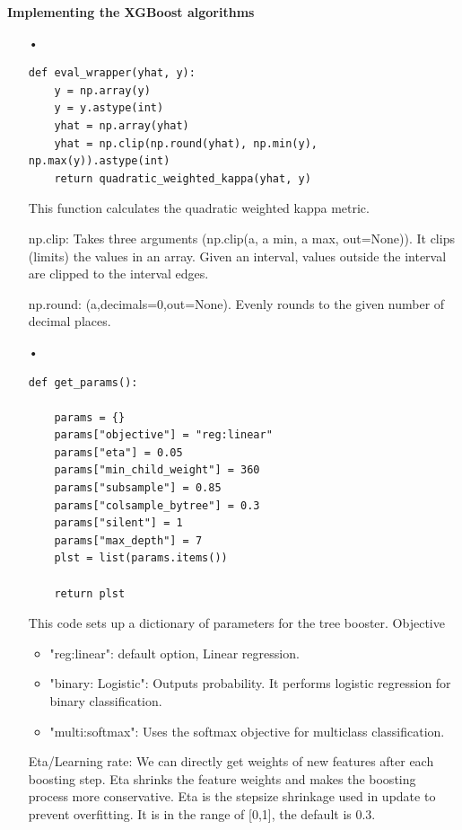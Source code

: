\textbf{Implementing the XGBoost algorithms}
\begin{enumerate}

\item[•] \begin{verbatim}
def eval_wrapper(yhat, y):  
    y = np.array(y)
    y = y.astype(int)
    yhat = np.array(yhat)
    yhat = np.clip(np.round(yhat), np.min(y), np.max(y)).astype(int)   
    return quadratic_weighted_kappa(yhat, y)
\end{verbatim}

This function calculates the quadratic weighted kappa metric.

np.clip: Takes three arguments (np.clip(a, a min, a max, out=None)). It clips (limits) the values in an array. Given an interval, values outside the interval are clipped to the interval edges.

np.round: (a,decimals=0,out=None). Evenly rounds to the given number of decimal places.

\item[•] \begin{verbatim}
def get_params():
    
    params = {}
    params["objective"] = "reg:linear"     
    params["eta"] = 0.05
    params["min_child_weight"] = 360
    params["subsample"] = 0.85
    params["colsample_bytree"] = 0.3
    params["silent"] = 1
    params["max_depth"] = 7
    plst = list(params.items())

    return plst
\end{verbatim}

This code sets up a dictionary of parameters for the tree booster.
Objective
\begin{itemize}
\item "reg:linear": default option, Linear regression.

\item "binary: Logistic": Outputs probability. It performs logistic regression for binary classification.

\item "multi:softmax": Uses the softmax objective for multiclass classification.
\end{itemize}

Eta/Learning rate: We can directly get weights of new features after each boosting step. Eta shrinks the feature weights and makes the boosting process more conservative.
Eta is the stepsize shrinkage used in update to prevent overfitting. It is in the range of [0,1], the default is 0.3.


\end{enumerate}
